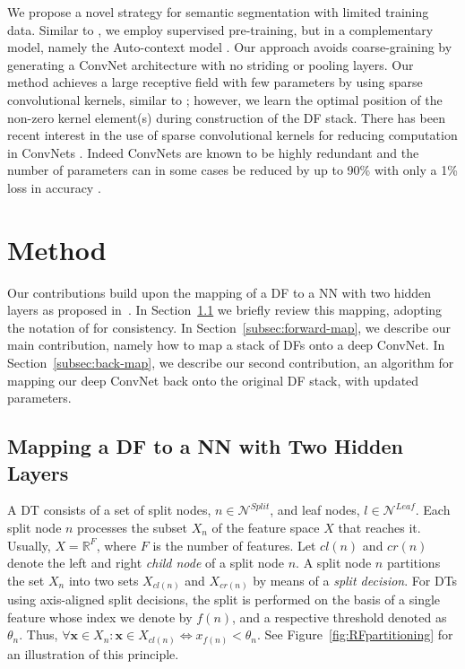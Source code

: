 \documentclass[twocolumn]{svjour3}
\begin{document}
We propose a novel strategy for semantic segmentation with limited training data.
Similar to \cite{Fahlman, Lengelle}, we employ supervised pre-training, but in a complementary model, namely the Auto-context model \cite{Tu2010}.
Our approach avoids coarse-graining by generating a ConvNet architecture with no striding or pooling layers. 
Our method achieves a large receptive field with few parameters by using sparse convolutional kernels, similar to \cite{Chen, Yu:2015uc}; however, we learn the optimal position of the non-zero kernel element(s) during construction of the DF stack.
There has been recent interest in the use of sparse convolutional kernels for reducing computation in ConvNets \cite{Zisserman:lowRank, Criminsi:lowRank, Liu:sparseCNN}.  
Indeed ConvNets are known to be highly redundant and the number of parameters can in some cases be reduced by up to 90\% with only a 1\% loss in accuracy \cite{Liu:sparseCNN}.

\section{Method}
\label{sec:method}

Our contributions build upon the mapping of a DF to a NN with two hidden layers as proposed in~\cite{Sethi1990,Welbl14}.
In Section~\ref{subsec:welbl} we briefly review this mapping, adopting the notation of \cite{Welbl14} for consistency.
In Section~\ref{subsec:forward-map}, we describe our main contribution, namely how to map a stack of DFs onto a deep ConvNet.
In Section~\ref{subsec:back-map}, we describe our second contribution, an algorithm for mapping our deep ConvNet back onto the original DF stack, with updated parameters.

\subsection{Mapping a DF to a NN with Two Hidden Layers}
\label{subsec:welbl}

A DT consists of a set of split nodes, $n \in \mathcal{N}^{Split}$, and leaf nodes, $l \in \mathcal{N}^{Leaf}$.
Each split node $n$ processes the subset $X_n$ of the feature space $X$ that reaches it. 
Usually, $X=\mathbb{R}^F$, where $F$ is the number of features. 
Let $cl(n)$ and $cr(n)$ denote the left and right \emph{child node} of a split node $n$.
A split node $n$ partitions the set $X_n$ into two sets $X_{cl(n)}$ and $X_{cr(n)}$ by means of a \emph{split decision}.
For DTs using axis-aligned split decisions, the split is performed on the basis of a single feature whose index we denote by $f(n)$, and a respective threshold denoted as $\theta_n$.  Thus, 
$\forall \mathbf{x} \in X_n: \mathbf{x} \in X_{cl(n)} \Longleftrightarrow x_{f(n)} < \theta_n $.  
See Figure~\ref{fig:RFpartitioning} for an illustration of this principle.
\end{document}
